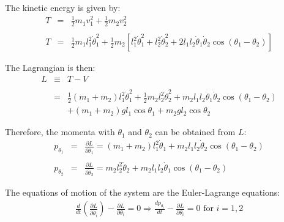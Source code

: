 \documentclass[12pt]{article}
\begin{document}
The kinetic energy is given by:
\begin{eqnarray}
    T &=& \frac{1}{2}m_1v_1^2 + \frac{1}{2}m_2v_2^2 \\
    \nonumber \\
    T &=& \frac{1}{2}m_1l_1^2\dot{\theta}_1^2 + \frac{1}{2}m_2[l_1^2\dot{\theta}_1^2 + l_2^2\dot{\theta}_2^2 + 2l_1l_2\dot{\theta}_1\dot{\theta}_2\cos(\theta_1 - \theta_2)]
\end{eqnarray}

The Lagrangian is then:
\begin{eqnarray}
    L &\equiv& T - V \\ \nonumber \\
    &=& \frac{1}{2}(m_1 + m_2)l_1^2\dot{\theta}_1^2 + \frac{1}{2}m_2l_2^2\dot{\theta}_2^2 + m_2l_1l_2\dot{\theta}_1\dot{\theta}_2\cos(\theta_1 - \theta_2) \nonumber \\ 
    & & + (m_1 + m_2)gl_1\cos\theta_1 + m_2gl_2\cos\theta_2
\end{eqnarray}

Therefore, the momenta with $\theta_1$ and $\theta_2$ can be obtained from $L$:
\begin{eqnarray}
    p_{\theta_1} &=& \frac{\partial L}{\partial\dot{\theta}_1} = (m_1 + m_2)l_1^2\dot{\theta}_1 + m_2l_1l_2\dot{\theta}_2\cos(\theta_1 - \theta_2) \\ \nonumber \\
    p_{\theta_2} &=& \frac{\partial L}{\partial\dot{\theta}_2} = m_2l_2^2\dot{\theta}_2 + m_2l_1l_2\dot{\theta}_1\cos(\theta_1 - \theta_2)
\end{eqnarray}

The equations of motion of the system are the Euler-Lagrange equations:
\begin{eqnarray}
    \frac{d}{dt}\left(\frac{\partial L}{\partial\dot{\theta}_i}\right) - \frac{\partial L}{\partial \theta_i} = 0 \Longrightarrow \frac{dp_{\theta_i}}{dt} - \frac{\partial L}{\partial \theta_i} = 0 \mbox{ for } i = 1,2 
\end{eqnarray}
\end{document}
